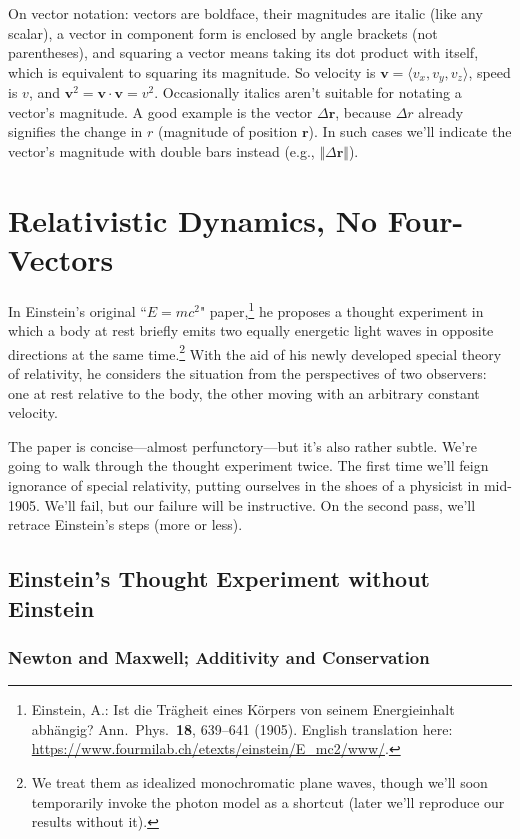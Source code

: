 \documentclass[12pt]{article}
\renewcommand{\vv}[1]{\mathbf{#1}}
\begin{document}
On vector notation: vectors are boldface, their magnitudes are italic (like any scalar), a vector in component form is enclosed by angle brackets (not parentheses), and squaring a vector means taking its dot product with itself, which is equivalent to squaring its magnitude. So velocity is $\vv v = \langle v_x, v_y, v_z \rangle$, speed is $v$, and $\vv v^2 = \vv v \cdot \vv v = v^2$. Occasionally italics aren't suitable for notating a vector's magnitude. A good example is the vector $\Delta \vv r$, because $\Delta r$ already signifies the change in $r$ (magnitude of position $\vv r$). In such cases we'll indicate the vector's magnitude with double bars instead (e.g., $\Vert \Delta \vv r \Vert$).

\clearpage


\section{Relativistic Dynamics, No Four-Vectors}


In Einstein's original ``$E=mc^2$" paper,\footnote{Einstein, A.: Ist die Tr\"agheit eines K\"orpers von seinem Energieinhalt abh\"angig? Ann.\ Phys.\ \textbf{18}, 639--641 (1905). English translation here: \url{https://www.fourmilab.ch/etexts/einstein/E_mc2/www/}.} he proposes a thought experiment in which a body at rest briefly emits two equally energetic light waves in opposite directions at the same time.\footnote{We treat them as idealized monochromatic plane waves, though we'll soon temporarily invoke the photon model as a shortcut (later we'll reproduce our results without it).} With the aid of his newly developed special theory of relativity, he considers the situation from the perspectives of two observers: one at rest relative to the body, the other moving with an arbitrary constant velocity.
 
The paper is concise---almost perfunctory---but it's also rather subtle. We're going to walk through the thought experiment twice. The first time we'll feign ignorance of special relativity, putting ourselves in the shoes of a physicist in mid-1905. We'll fail, but our failure will be instructive. On the second pass, we'll retrace Einstein's steps (more or less).


\subsection{Einstein's Thought Experiment without Einstein}
 
\subsubsection{Newton and Maxwell; Additivity and Conservation}
\end{document}
